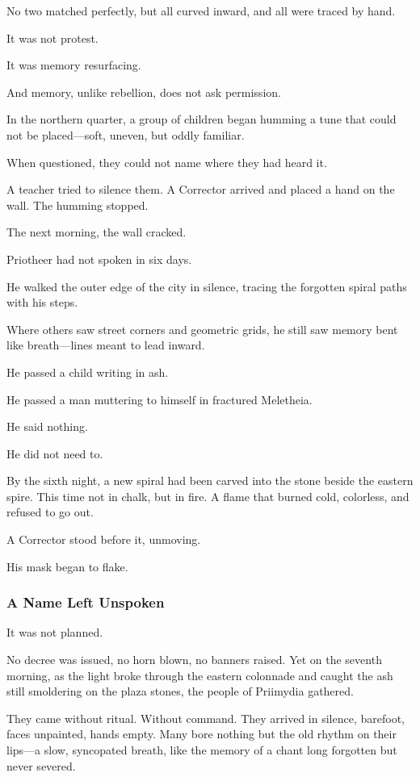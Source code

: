 \documentclass[12pt]{article}
\begin{document}
No two matched perfectly, but all curved inward, and all were traced by hand.

It was not protest. 

It was memory resurfacing. 

And memory, unlike rebellion, does not ask permission.

In the northern quarter, a group of children began humming a tune that could not be placed—soft, uneven, but oddly familiar. 

When questioned, they could not name where they had heard it. 

A teacher tried to silence them. A Corrector arrived and placed a hand on the wall. The humming stopped.

The next morning, the wall cracked.

Priotheer had not spoken in six days. 

He walked the outer edge of the city in silence, tracing the forgotten spiral paths with his steps. 

Where others saw street corners and geometric grids, he still saw memory bent like breath—lines meant to lead inward.

He passed a child writing in ash. 

He passed a man muttering to himself in fractured Meletheia. 

He said nothing. 

He did not need to.

By the sixth night, a new spiral had been carved into the stone beside the eastern spire. This time not in chalk, but in fire. A flame that burned cold, colorless, and refused to go out.

A Corrector stood before it, unmoving.

His mask began to flake.

\dotfill

\subsubsection*{A Name Left Unspoken}

It was not planned.

No decree was issued, no horn blown, no banners raised. Yet on the seventh morning, as the light broke through the eastern colonnade and caught the ash still smoldering on the plaza stones, the people of Priimydia gathered.

They came without ritual. Without command. They arrived in silence, barefoot, faces unpainted, hands empty. Many bore nothing but the old rhythm on their lips—a slow, syncopated breath, like the memory of a chant long forgotten but never severed.
\end{document}
